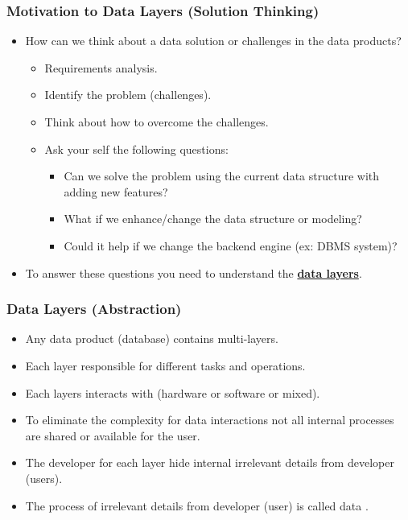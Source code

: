 \begin{frame}
	\frametitle{Motivation to Data Layers (Solution Thinking)}
	
	\begin{itemize}[<+->]
		\item How can we think about a data solution or challenges in the data products?
		\begin{itemize}[<+->]
			\item Requirements analysis.
			\item Identify the problem (challenges).
			\item Think about how to overcome the challenges.
			\item Ask your self the following questions:
			\begin{itemize}[<+->]
				\item Can we solve the problem using the current data structure with adding new features?
				\item What if we enhance/change the data structure or modeling?
				\item Could it help if we change the backend engine (ex: DBMS system)?
			\end{itemize}			
		\end{itemize}
		\item To answer these questions you need to understand the \textbf{\underline{data layers}}.
	\end{itemize}
	
\end{frame}
\begin{frame}
	\frametitle{Data Layers (Abstraction)}
	\begin{itemize}[<+->]
		\item Any data product (database) contains multi-layers.
		\item Each layer responsible for different tasks and operations.
		\item Each layers interacts with (hardware or software or mixed).
		\item To eliminate the complexity for data interactions not all internal processes are shared or available for the user.
		\item The developer for each layer hide internal irrelevant details from developer (users). 
		\item The process of \textbf{\underline{}} irrelevant details from developer (user) is called data \textbf{\underline{}}.
	\end{itemize}	
\end{frame}
